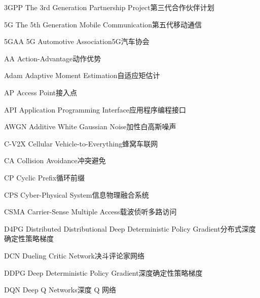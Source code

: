 
\begin{abbreviate}[0mm][18mm]
\item[3GPP] The 3rd Generation Partnership Project\hspace{1em}第三代合作伙伴计划
\item[5G] The 5th Generation Mobile Communication\hspace{1em}第五代移动通信
\item[5GAA] 5G Automotive Association\hspace{1em}5G汽车协会
\item[AA] Action-Advantage\hspace{1em}动作优势
\item[Adam] Adaptive Moment Estimation\hspace{1em}自适应矩估计
\item[AP] Access Point\hspace{1em}接入点
\item[API] Application Programming Interface\hspace{1em}应用程序编程接口
\item[AWGN] Additive White Gaussian Noise\hspace{1em}加性白高斯噪声
\item[C-V2X] Cellular Vehicle-to-Everything\hspace{1em}蜂窝车联网
\item[CA] Collision Avoidance\hspace{1em}冲突避免
\item[CP] Cyclic Prefix\hspace{1em}循环前缀
\item[CPS] Cyber-Physical System\hspace{1em}信息物理融合系统
\item[CSMA] Carrier-Sense Multiple Access\hspace{1em}载波侦听多路访问
\item[D4PG] Distributed Distributional Deep Deterministic Policy Gradient\hspace{1em}分布式深度确定性策略梯度
\item[DCN] Dueling Critic Network\hspace{1em}决斗评论家网络
\item[DDPG] Deep Deterministic Policy Gradient\hspace{1em}深度确定性策略梯度
\item[DQN] Deep Q Networks\hspace{1em}深度 Q 网络

\end{abbreviate}
